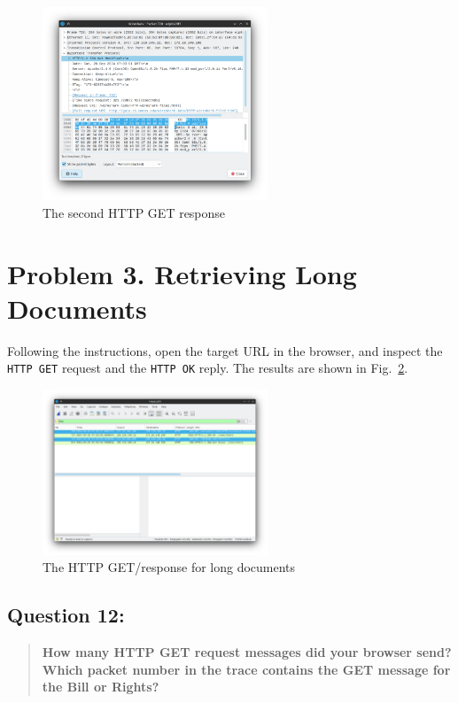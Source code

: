 \documentclass{cshwk}
\begin{document}
\begin{figure}[htbp]
    \centering
    \includegraphics[width=0.6\textwidth]{lab2-8.png}
    \caption{The second HTTP GET response}
    \label{fig:http-conditional-get-2-response}
\end{figure}

\section*{Problem 3. Retrieving Long Documents}

Following the instructions, open the target URL in the browser, and inspect the \texttt{HTTP GET} request and the \texttt{HTTP OK} reply. The results are shown in Fig.~\ref{fig:http-long-documents}.

\begin{figure}[htbp]
    \centering
    \includegraphics[width=0.6\textwidth]{lab2-9.png}
    \caption{The HTTP GET/response for long documents}
    \label{fig:http-long-documents}
\end{figure}

\subsection*{Question 12:}
\begin{quote}
    \textbf{How many HTTP GET request messages did your browser send? Which packet number in the trace contains the GET message for the Bill or Rights?}
\end{quote}
\end{document}
